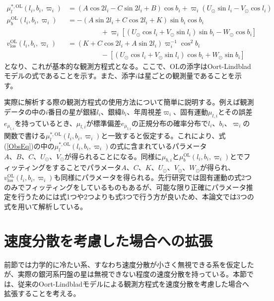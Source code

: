 \begin{subequations}
\begin{align}
	\mu^{*,\mathrm{OL}}_l(l_i,b_i,\varpi_i) &= (A\cos2l_i - C\sin2l_i + B)\cos b_i + \varpi_i(U_{\odot}\sin l_i - V_{\odot}\cos l_i) \\
	\mu^{\mathrm{OL}}_b(l_i,b_i,\varpi_i) &= -(A\sin2l_i + C\cos2l_i + K)\sin b_i \cos b_i \nonumber \\
	                          & \hspace{2cm} + \varpi_i[(U_{\odot}\cos l_i + V_{\odot} \sin l_i)\sin b_i - W_{\odot} \cos b_i] \\
	v^{\mathrm{OL}}_{\mathrm{los}}(l_i,b_i,\varpi_i) &= (K + C\cos2l_i + A\sin2l_i)\varpi_i^{-1}  \cos^2 b_i \nonumber\\
	                      & \hspace{2cm} - [(U_{\odot}\cos l_i + V_{\odot} \sin l_i)\cos b_i + W_{\odot} \sin b_i]
\end{align} \label{ObsEq}
\end{subequations}
となり、これが基本的な観測方程式となる。ここで、OLの添字はOort-Lindbladモデルの式であることを示す。また、添字$i$は星ごとの観測量であることを示す。

実際に解析する際の観測方程式の使用方法について簡単に説明する。例えば観測データの中の$i$番目の星が銀経$l_i$、銀緯$b_i$、年周視差$\varpi_i$、固有運動$\mu_ {l,i}$とその誤差$e_{\mu_ {l,i}}$を持っているとき、$\mu_{l,i}$が標準偏差$e_{\mu_ {l,i}}$の正規分布の確率分布で$l_i、b_i、\varpi_i$の関数で書ける$\mu^{*,\mathrm{OL}}_l(l_i,b_i,\varpi_i)$と一致すると仮定する。これにより、式(\ref{ObsEq})の中の$\mu^{*,\mathrm{OL}}_l(l_i,b_i,\varpi_i)$の式に含まれているパラメータ$A、B、C、U_{\odot}、V_{\odot}$が得られることになる。同様に$\mu_{b,i}$と$\mu^{\mathrm{OL}}_b(l_i,b_i,\varpi_i)$とでフィッティングをすることでパラメータ$A、C、K、U_{\odot}、V_{\odot}、W_{\odot}$が得られ、$v^{\mathrm{OL}}_{\mathrm{los}}(l_i,b_i,\varpi_i)$も同様にパラメータを得られる。先行研究では固有運動の式2つのみでフィッティングをしているものもあるが、可能な限り正確にパラメータ推定を行うためには式1つや2つよりも式3つで行う方が良いため、本論文では3つの式を用いて解析している。


\section{速度分散を考慮した場合への拡張} %
前節では力学的に冷たい系、すなわち速度分散が小さく無視できる系を仮定したが、実際の銀河系円盤の星は無視できない程度の速度分散を持っている。本節では、従来のOort-Lindbladモデルによる観測方程式を速度分散を考慮した場合へ拡張することを考える。


